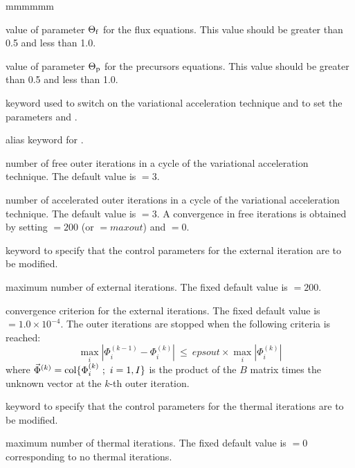 \begin{ListeDeDescription}{mmmmmm}
\item[\dusa{ttflx}] value of  parameter $ \Theta_{\rm f}$ for the flux equations. This value should be
greater than 0.5 and less than 1.0.

\item[\dusa{ttprc}] value of  parameter $ \Theta_{\rm p}$ for the precursors equations. This value should be
greater than 0.5 and less than 1.0.

\item[\moc{VAR1}] keyword used to switch on the variational acceleration technique and to
set the parameters  and .

\item[\moc{ACCE}] alias keyword for .

\item[\dusa{icl1}] number of free outer iterations  in a cycle of the variational acceleration technique.
The default value is  $=3$.

\item[\dusa{icl2}] number of accelerated outer iterations  in a cycle of the
variational acceleration technique. The default value is  $=3$. A convergence in free iterations is
obtained by setting  $=200$ (or  $=maxout$) and  $=0$.

\item[\moc{EXTE}] keyword to specify that the control parameters for the
external iteration are to be modified. 

\item[\dusa{maxout}] maximum number of external iterations. The fixed default
value is  $=200$.

\item[\dusa{epsout}] convergence criterion for the external iterations. The
fixed default value is  $=1.0\times 10^{-4}$. The outer iterations are stopped when the following criteria is reached:
$$\max_i | \Phi_i^{(k-1)} - \Phi_i^{(k)} | \ \le \ epsout \times \max_i | \Phi_i^{(k)} |$$
\noindent where $\vec\Phi^{(k)}={\rm col}\{\Phi_i^{(k)} \ ; \ i=1,I\}$ is the product of the $B$ matrix times the unknown vector at the $k$-th outer iteration.

\item[\moc{THER}] keyword to specify that the control parameters for the
thermal iterations are to be modified.

\item[\dusa{maxthr}] maximum number of thermal iterations. The fixed default
value is  $=0$ corresponding to no thermal iterations.


\end{ListeDeDescription}
